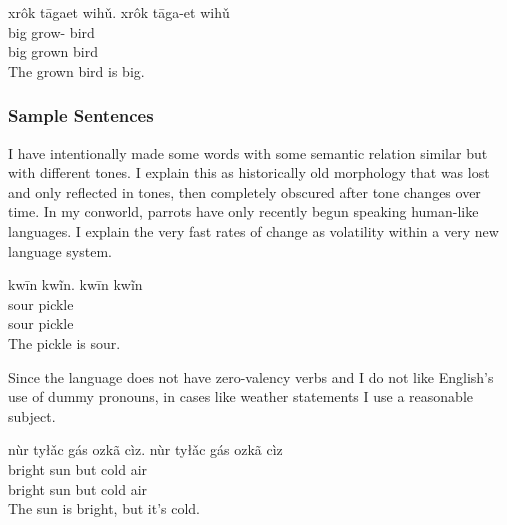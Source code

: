 \documentclass[12pt]{article}
\begin{document}
    \begin{exe}
        \ex
        xrôk tāgaet wihǔ.
        \glll
        xrôk tāga-et wihǔ \\
        big grow-\Ptcp{} bird \\
        big grown bird \\
        \glt
        The grown bird is big.
    \end{exe}

    \subsubsection*{Sample Sentences}

    I have intentionally made some words with
    some semantic relation similar but with different tones.
    I explain this as historically old morphology
    that was lost and only reflected in tones,
    then completely obscured after tone changes over time.
    In my conworld, parrots have only recently begun
    speaking human-like languages.
    I explain the very fast rates of change
    as volatility within a very new language system.

    \begin{exe}
        \ex
        kwīn kwĩn.
        \glll
        kwīn kwĩn \\
        sour pickle \\
        sour pickle \\
        \glt
        The pickle is sour.
    \end{exe}

    Since the language does not have zero-valency verbs
    and I do not like English's use of dummy pronouns,
    in cases like weather statements
    I use a reasonable subject.

    \begin{exe}
        \ex
        nùr tyłǎc gás ozkã cìz.
        \glll
        nùr tyłǎc gás ozkã cìz \\
        bright sun but cold air \\
        bright sun but cold air \\
        \glt
        The sun is bright, but it's cold.
    \end{exe}
\end{document}
